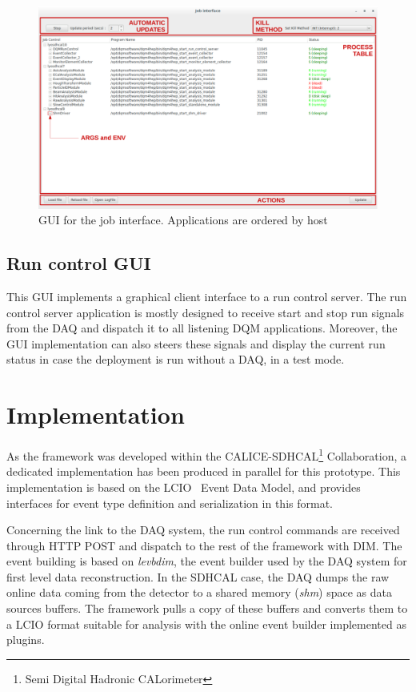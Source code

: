 \documentclass[conference]{IEEEtran}
\begin{document}
\begin{figure}[p]
  \begin{center}
    \includegraphics[width=0.95\linewidth]{figs/JobControlGui.pdf}
    \caption{\label{fig:JobControlGUI} GUI for the job interface. Applications are ordered by host}
  \end{center}
\end{figure}

\subsection{Run control GUI}

This GUI implements a graphical client interface to a run control server. The run control server application is mostly designed to receive start and stop run signals from the DAQ and dispatch it to all listening DQM applications. Moreover, the GUI implementation can also steers these signals and display the current run status in case the deployment is run without a DAQ, in a test mode.

\section{Implementation}

As the framework was developed within the CALICE-SDHCAL\footnote{Semi Digital Hadronic CALorimeter} Collaboration, a dedicated implementation has been produced in parallel for this prototype. This implementation is based on the LCIO~\cite{LCIO} Event Data Model, and provides interfaces for event type definition and serialization in this format.


Concerning the link to the DAQ system, the run control commands are received through HTTP POST and dispatch to the rest of the framework with DIM. The event building is based on \textit{levbdim}, the event builder used by the DAQ system for first level data reconstruction. In the SDHCAL case, the DAQ dumps the raw online data coming from the detector to a shared memory (\textit{shm}) space as data sources buffers. The framework pulls a copy of these buffers and converts them to a LCIO format suitable for analysis with the online event builder implemented as plugins.
\end{document}
